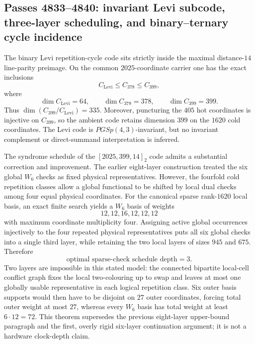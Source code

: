 \subsection{Passes 4833--4840: invariant Levi subcode, three-layer scheduling, and binary--ternary cycle incidence}
\label{subsec:pass4833-4840}

The binary Levi repetition-cycle code sits strictly inside the maximal distance-$14$ line-parity preimage.  On the common $2025$-coordinate carrier one has the exact inclusions
\[
C_{\mathrm{Levi}}\le C_{378}\le C_{399},
\]
where
\[
\dim C_{\mathrm{Levi}}=64,
\qquad
\dim C_{378}=378,
\qquad
\dim C_{399}=399.
\]
Thus $\dim(C_{399}/C_{\mathrm{Levi}})=335$.  Moreover, puncturing the $405$ hot coordinates is injective on $C_{399}$, so the ambient code retains dimension $399$ on the $1620$ cold coordinates.  The Levi code is $PGSp(4,3)$-invariant, but no invariant complement or direct-summand interpretation is inferred.

The syndrome schedule of the $[2025,399,14]_2$ code admits a substantial correction and improvement.  The earlier eight-layer construction treated the six global $W_6$ checks as fixed physical representatives.  However, the fourfold cold repetition classes allow a global functional to be shifted by local dual checks among four equal physical coordinates.  For the canonical sparse rank-$1620$ local basis, an exact finite search yields a $W_6$ basis of weights
\[
12,12,16,12,12,12
\]
with maximum coordinate multiplicity four.  Assigning active global occurrences injectively to the four repeated physical representatives puts all six global checks into a single third layer, while retaining the two local layers of sizes $945$ and $675$.  Therefore
\[
\boxed{\text{optimal sparse-check schedule depth}=3}.
\]
Two layers are impossible in this stated model: the connected bipartite local-cell conflict graph fixes the local two-colouring up to swap and leaves at most one globally usable representative in each logical repetition class.  Six outer basis supports would then have to be disjoint on $27$ outer coordinates, forcing total outer weight at most $27$, whereas every $W_6$ basis has total weight at least $6\cdot12=72$.  This theorem supersedes the previous eight-layer upper-bound paragraph and the first, overly rigid six-layer continuation argument; it is not a hardware clock-depth claim.


